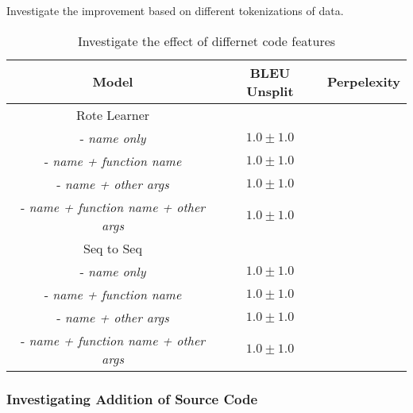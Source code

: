 Investigate the improvement based on different tokenizations of data.

\begin{table}[h!]
\begin{center}
\begin{tabular}{ c | c | c }
    Model                               & BLEU Unsplit            & Perpelexity \\
    \hline
    \hline
    Rote Learner                        &                  & \\    
    - \textit{name only}                & $1.0 \pm 1.0 $   & \\
    - \textit{name + function name}     & $1.0 \pm 1.0 $   & \\
    - \textit{name + other args}        & $1.0 \pm 1.0 $   & \\
    - \textit{name + function name + other args}     & $1.0 \pm 1.0 $   & \\
    \hline
    \hline
    Seq to Seq                          &                  &  \\
    - \textit{name only}                & $1.0 \pm 1.0 $   & \\
    - \textit{name + function name}     & $1.0 \pm 1.0 $   & \\
    - \textit{name + other args}        & $1.0 \pm 1.0 $   & \\
    - \textit{name + function name + other args}     & $1.0 \pm 1.0 $   & \\
    \hline
\end{tabular}
\caption {Investigate the effect of differnet code features}
\label{table:tokenization}
\end{center}
\end{table}




\subsubsection{Investigating Addition of Source Code} %
\label{subs:investigating_tokenizations_with_source_code}

